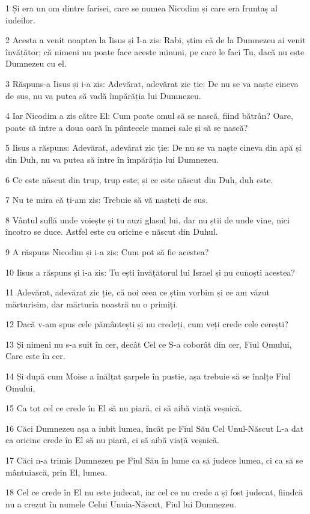 \par 1 Și era un om dintre farisei, care se numea Nicodim și care era fruntaș al iudeilor.
\par 2 Acesta a venit noaptea la Iisus și I-a zis: Rabi, știm că de la Dumnezeu ai venit învățător; că nimeni nu poate face aceste minuni, pe care le faci Tu, dacă nu este Dumnezeu cu el.
\par 3 Răspuns-a Iisus și i-a zis: Adevărat, adevărat zic ție: De nu se va naște cineva de sus, nu va putea să vadă împărăția lui Dumnezeu.
\par 4 Iar Nicodim a zis către El: Cum poate omul să se nască, fiind bătrân? Oare, poate să intre a doua oară în pântecele mamei sale și să se nască?
\par 5 Iisus a răspuns: Adevărat, adevărat zic ție: De nu se va naște cineva din apă și din Duh, nu va putea să intre în împărăția lui Dumnezeu.
\par 6 Ce este născut din trup, trup este; și ce este născut din Duh, duh este.
\par 7 Nu te mira că ți-am zis: Trebuie să vă nașteți de sus.
\par 8 Vântul suflă unde voiește și tu auzi glasul lui, dar nu știi de unde vine, nici încotro se duce. Astfel este cu oricine e născut din Duhul.
\par 9 A răspuns Nicodim și i-a zis: Cum pot să fie acestea?
\par 10 Iisus a răspuns și i-a zis: Tu ești învățătorul lui Israel și nu cunoști acestea?
\par 11 Adevărat, adevărat zic ție, că noi ceea ce știm vorbim și ce am văzut mărturisim, dar mărturia noastră nu o primiți.
\par 12 Dacă v-am spus cele pământești și nu credeți, cum veți crede cele cerești?
\par 13 Și nimeni nu s-a suit în cer, decât Cel ce S-a coborât din cer, Fiul Omului, Care este în cer.
\par 14 Și după cum Moise a înălțat șarpele în pustie, așa trebuie să se înalțe Fiul Omului,
\par 15 Ca tot cel ce crede în El să nu piară, ci să aibă viață veșnică.
\par 16 Căci Dumnezeu așa a iubit lumea, încât pe Fiul Său Cel Unul-Născut L-a dat ca oricine crede în El să nu piară, ci să aibă viață veșnică.
\par 17 Căci n-a trimis Dumnezeu pe Fiul Său în lume ca să judece lumea, ci ca să se mântuiască, prin El, lumea.
\par 18 Cel ce crede în El nu este judecat, iar cel ce nu crede a și fost judecat, fiindcă nu a crezut în numele Celui Unuia-Născut, Fiul lui Dumnezeu.
